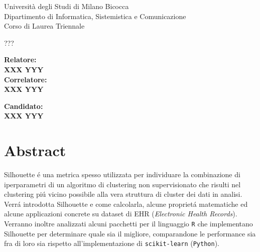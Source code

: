 \documentclass[12pt]{report}
\begin{document}
	\begin{titlepage}
		\begin{center}
			{\LARGE{Università degli Studi di Milano Bicocca \\}}
			{\small{Dipartimento di Informatica, Sistemistica e Comunicazione}}\\
			{\small{Corso di Laurea Triennale}}
		\end{center}
			
		\begin{figure}[H]
			\centering
		\end{figure}

		\begin{center}
			{\Large { ??? }}
		\end{center}

		\vspace{2cm}

		\begin{minipage}[t]{0.47\textwidth}
			{\large{\bf Relatore:\\ XXX YYY}}
			\vspace{0.5cm}
			{\large{\bf \\Correlatore:\\ XXX YYY}}
		\end{minipage}\hfill\begin{minipage}[t]{0.47\textwidth}\raggedleft
			{\large{\bf Candidato: \\XXX YYY\\ }}
		\end{minipage}

		\vspace{25mm}

	\end{titlepage}

	\tableofcontents
	\thispagestyle{empty}

	\listoffigures
	\thispagestyle{empty}
	\clearpage

	\setcounter{page}{1}

	\chapter{Abstract}

		Silhouette é una metrica spesso utilizzata per individuare
		la combinazione di iperparametri di un algoritmo di clustering
		non supervisionato che risulti nel clustering piú vicino possibile
		alla vera struttura di cluster dei dati in analisi. Verrá introdotta
		Silhouette e come calcolarla, alcune proprietá matematiche ed alcune
		applicazioni concrete su dataset di EHR (\textit{Electronic Health
		Records}). Verranno inoltre analizzati alcuni pacchetti per il
		linguaggio \texttt{R} che implementano Silhouette per determinare
		quale sia il migliore, comparandone le performance sia fra di
		loro sia rispetto all'implementazione di \texttt{scikit-learn}
		(\texttt{Python}).
\end{document}
